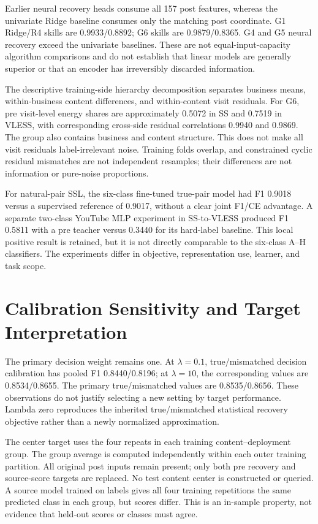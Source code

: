 \documentclass[journal]{IEEEtran}
\begin{document}
Earlier neural recovery heads consume all 157 post features, whereas the univariate Ridge baseline consumes only the matching post coordinate. G1 Ridge/R4 skills are 0.9933/0.8892; G6 skills are 0.9879/0.8365. G4 and G5 neural recovery exceed the univariate baselines. These are not equal-input-capacity algorithm comparisons and do not establish that linear models are generally superior or that an encoder has irreversibly discarded information.

The descriptive training-side hierarchy decomposition separates business means, within-business content differences, and within-content visit residuals. For G6, pre visit-level energy shares are approximately 0.5072 in SS and 0.7519 in VLESS, with corresponding cross-side residual correlations 0.9940 and 0.9869. The group also contains business and content structure. This does not make all visit residuals label-irrelevant noise. Training folds overlap, and constrained cyclic residual mismatches are not independent resamples; their differences are not information or pure-noise proportions.

For natural-pair SSL, the six-class fine-tuned true-pair model had F1 0.9018 versus a supervised reference of 0.9017, without a clear joint F1/CE advantage. A separate two-class YouTube MLP experiment in SS-to-VLESS produced F1 0.5811 with a pre teacher versus 0.3440 for its hard-label baseline. This local positive result is retained, but it is not directly comparable to the six-class A--H classifiers. The experiments differ in objective, representation use, learner, and task scope.

\section{Calibration Sensitivity and Target Interpretation}
The primary decision weight remains one. At $\lambda=0.1$, true/mismatched decision calibration has pooled F1 0.8440/0.8196; at $\lambda=10$, the corresponding values are 0.8534/0.8655. The primary true/mismatched values are 0.8535/0.8656. These observations do not justify selecting a new setting by target performance. Lambda zero reproduces the inherited true/mismatched statistical recovery objective rather than a newly normalized approximation.

The center target uses the four repeats in each training content--deployment group. The group average is computed independently within each outer training partition. All original post inputs remain present; only both pre recovery and source-score targets are replaced. No test content center is constructed or queried. A source model trained on labels gives all four training repetitions the same predicted class in each group, but scores differ. This is an in-sample property, not evidence that held-out scores or classes must agree.
\end{document}
